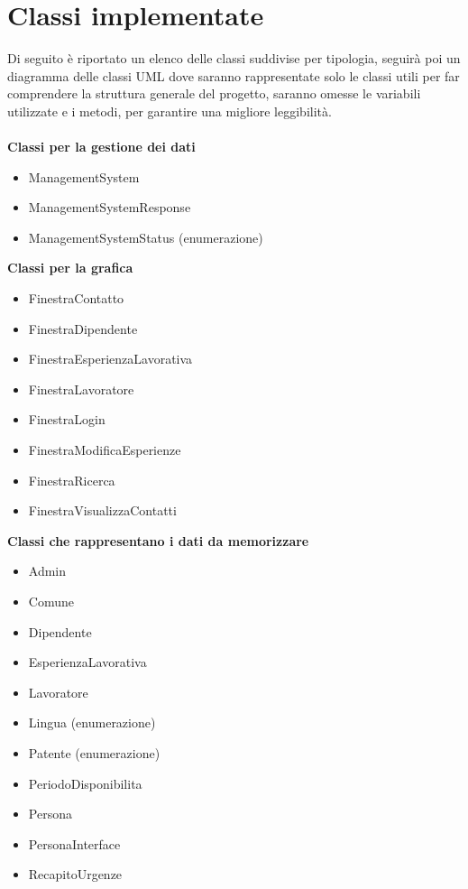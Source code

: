 \documentclass[ 4paper,11pt,openany]{book}
\begin{document}
\section{Classi implementate}
Di seguito è riportato un elenco delle classi suddivise per tipologia, seguirà poi un diagramma delle classi UML dove saranno rappresentate solo le classi utili per far comprendere la struttura generale del progetto, saranno omesse le variabili utilizzate e i metodi, per garantire una migliore leggibilità.\\\\
\textbf{Classi per la gestione dei dati}
\begin{itemize}
\item ManagementSystem
\item ManagementSystemResponse
\item ManagementSystemStatus (enumerazione)
\end{itemize}
\textbf{Classi per la grafica}
\begin{itemize}
\item FinestraContatto
\item FinestraDipendente
\item FinestraEsperienzaLavorativa
\item FinestraLavoratore
\item FinestraLogin 
\item FinestraModificaEsperienze
\item FinestraRicerca
\item FinestraVisualizzaContatti
\end{itemize}
\textbf{Classi che rappresentano i dati da memorizzare}
\begin{itemize}
\item Admin
\item Comune
\item Dipendente
\item EsperienzaLavorativa
\item Lavoratore
\item Lingua (enumerazione)
\item Patente (enumerazione)
\item PeriodoDisponibilita
\item Persona
\item PersonaInterface
\item RecapitoUrgenze
\end{itemize}
\end{document}
